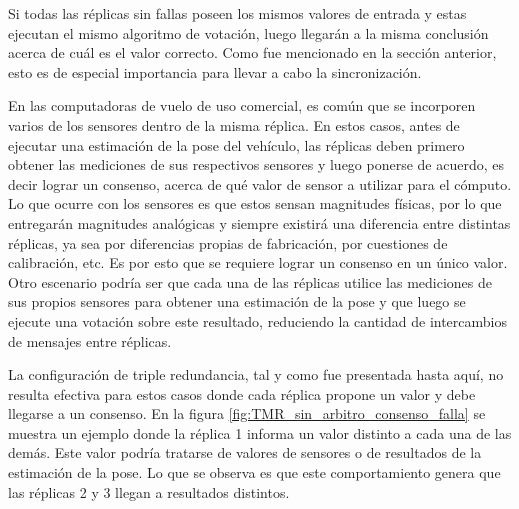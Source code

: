 Si todas las réplicas sin fallas poseen los mismos valores de entrada y estas ejecutan el mismo algoritmo de votación, luego llegarán a la misma conclusión acerca de cuál es el valor correcto. Como fue mencionado en la sección anterior, esto es de especial importancia para llevar a cabo la sincronización. 

En las computadoras de vuelo de uso comercial, es común que se incorporen varios de los sensores dentro de la misma réplica. En estos casos, antes de ejecutar una estimación de la pose del vehículo, las réplicas deben primero obtener las mediciones de sus respectivos sensores y luego ponerse de acuerdo, es decir lograr un consenso, acerca de qué valor de sensor a utilizar para el cómputo. Lo que ocurre con los sensores es que estos sensan magnitudes físicas, por lo que entregarán magnitudes analógicas y siempre existirá una diferencia entre distintas réplicas, ya sea por diferencias propias de fabricación, por cuestiones de calibración, etc. Es por esto que se requiere lograr un consenso en un único valor. Otro escenario podría ser que cada una de las réplicas utilice las mediciones de sus propios sensores para obtener una estimación de la pose y que luego se ejecute una votación sobre este resultado, reduciendo la cantidad de intercambios de mensajes entre réplicas.

La configuración de triple redundancia, tal y como fue presentada hasta aquí, no resulta efectiva para estos casos donde cada réplica propone un valor y debe llegarse a un consenso. En la figura \ref{fig:TMR_sin_arbitro_consenso_falla} se muestra un ejemplo donde la réplica 1 informa un valor distinto a cada una de las demás. Este valor podría tratarse de valores de sensores o de resultados de la estimación de la pose. Lo que se observa es que este comportamiento genera que las réplicas 2 y 3 llegan a resultados distintos.


